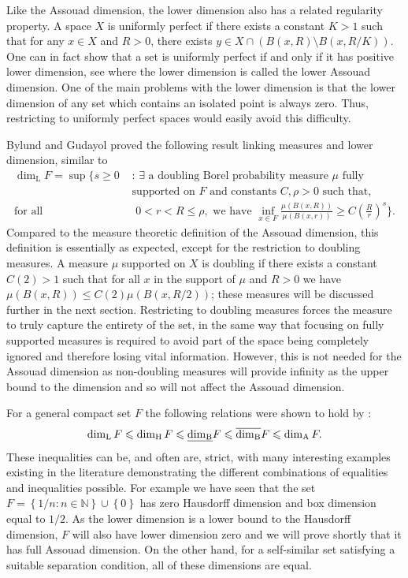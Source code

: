 Like the Assouad dimension, the lower dimension also has a related regularity property. A space $X$ is uniformly perfect if there exists a constant $K > 1$ such that for any $x \in X$ and $R > 0$, there exists $y \in X \cap \left(B(x, R) \setminus B(x, R/K)\right)$. One can in fact show that a set is uniformly perfect if and only if it has positive lower dimension, see \cite[Lemma 2.1]{anti1} where the lower dimension is called the lower Assouad dimension. One of the main problems with the lower dimension is that the lower dimension of any set which contains an isolated point is always zero. Thus, restricting to uniformly perfect spaces would easily avoid this difficulty. 

Bylund and Gudayol \cite{bylund} proved the following result linking measures and lower dimension, similar to \cite{luksak, konyagin}
\begin{align*}
\dim_{\text{L}} F = \sup \Bigg\{ s \geq 0 \, \,  &: \, \exists \text{ a doubling Borel probability measure } \mu \text{ fully } \\  
&\text{supported on }F \text{ and constants }C, \rho > 0  \text{ such that, } \\ 
\text{for all } &\, \, 0< r< R \leq \rho, \text{ we have  }\inf_{x\in F} \frac{\mu(B(x,R))}{\mu(B(x,r))} \geq C\left(\frac{R}{r}\right)^{s} \Bigg\}.
\end{align*}
Compared to the measure theoretic definition of the Assouad dimension, this definition is essentially as expected, except for the restriction to doubling measures. A measure $\mu$ supported on $X$ is doubling if there exists a constant $C(2) > 1$ such that for all $x$ in the support of $\mu$ and $R > 0$ we have $\mu( B(x,R)) \le C(2) \mu(B(x,R/2))$; these measures will be discussed further in the next section. Restricting to doubling measures forces the measure to truly capture the entirety of the set, in the same way that focusing on fully supported measures is required to avoid part of the space being completely ignored and therefore losing vital information. However, this is not needed for the Assouad dimension as non-doubling measures will provide infinity as the upper bound to the dimension and so will not affect the Assouad dimension. 


For a general compact set $F$ the following relations were shown to hold by \cite{Fr, larman1, larman2}:
\[
\dim_{\textup{L}} F \leqslant \dim_{\text{H}} F \leqslant \underline{\dim_{\textup{B}}} F \leqslant \overline{\dim_{\textup{B}}} F \leqslant \dim_{\textup{A}} F.
\]
These inequalities can be, and often are, strict, with many interesting examples existing in the literature demonstrating the different combinations of equalities and inequalities possible. For example we have seen that the set $F=\left\{1/n \colon n \in \mathbb{N} \right\} \cup \left\{0 \right\}$ has zero Hausdorff dimension and box dimension equal to $1/2$. As the lower dimension is a lower bound to the Hausdorff dimension, $F$ will also have lower dimension zero and we will prove shortly that it has full Assouad dimension. On the other hand, for a self-similar set satisfying a suitable separation condition, all of these dimensions are equal. 

